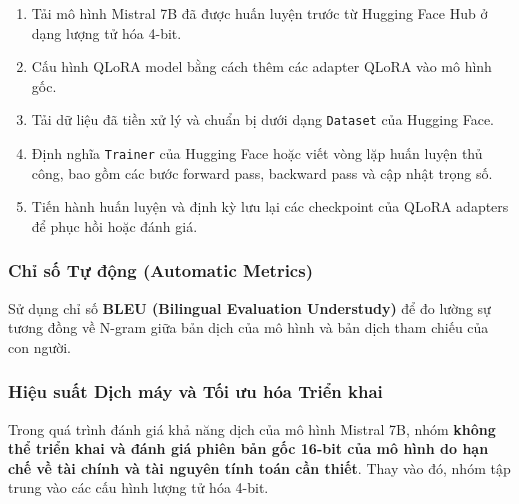 \begin{itemize}
    \begin{enumerate}
        \item Tải mô hình Mistral 7B đã được huấn luyện trước từ Hugging Face Hub ở dạng lượng tử hóa 4-bit.
        \item Cấu hình QLoRA model bằng cách thêm các adapter QLoRA vào mô hình gốc.
        \item Tải dữ liệu đã tiền xử lý và chuẩn bị dưới dạng \texttt{Dataset} của Hugging Face.
        \item Định nghĩa \texttt{Trainer} của Hugging Face hoặc viết vòng lặp huấn luyện thủ công, bao gồm các bước forward pass, backward pass và cập nhật trọng số.
        \item Tiến hành huấn luyện và định kỳ lưu lại các checkpoint của QLoRA adapters để phục hồi hoặc đánh giá.
    \end{enumerate}
\end{itemize}


\subsubsection{Chỉ số Tự động (Automatic Metrics)}
Sử dụng chỉ số \textbf{BLEU (Bilingual Evaluation Understudy)} để đo lường sự tương đồng về N-gram giữa bản dịch của mô hình và bản dịch tham chiếu của con người.


\subsubsection{Hiệu suất Dịch máy và Tối ưu hóa Triển khai}
Trong quá trình đánh giá khả năng dịch của mô hình Mistral 7B, nhóm \textbf{không thể triển khai và đánh giá phiên bản gốc 16-bit của mô hình do hạn chế về tài chính và tài nguyên tính toán cần thiết}. Thay vào đó, nhóm tập trung vào các cấu hình lượng tử hóa 4-bit.

